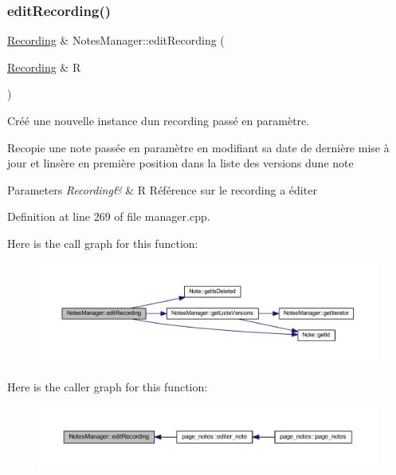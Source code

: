 \subsubsection{\texorpdfstring{edit\+Recording()}{editRecording()}}
{\footnotesize\ttfamily \hyperlink{class_recording}{Recording} \& Notes\+Manager\+::edit\+Recording (\begin{DoxyParamCaption}\item[{\hyperlink{class_recording}{Recording} \&}]{R }\end{DoxyParamCaption})}



Créé une nouvelle instance d\textquotesingle{}un recording passé en paramètre. 

Recopie une note passée en paramètre en modifiant sa date de dernière mise à jour et l\textquotesingle{}insère en première position dans la liste des versions d\textquotesingle{}une note 
\begin{DoxyParams}{Parameters}
{\em Recording\&} & R Référence sur le recording a éditer \\
\hline
\end{DoxyParams}


Definition at line 269 of file manager.\+cpp.

Here is the call graph for this function\+:\nopagebreak
\begin{figure}[H]
\begin{center}
\leavevmode
\includegraphics[width=350pt]{class_notes_manager_a1c4cfa021a12b6416c4e800d643b5e0a_cgraph}
\end{center}
\end{figure}
Here is the caller graph for this function\+:\nopagebreak
\begin{figure}[H]
\begin{center}
\leavevmode
\includegraphics[width=350pt]{class_notes_manager_a1c4cfa021a12b6416c4e800d643b5e0a_icgraph}
\end{center}
\end{figure}
\mbox{\label{class_notes_manager_a8f8f2b6aaa8c7d41356f9e4be7da2da5}} 
